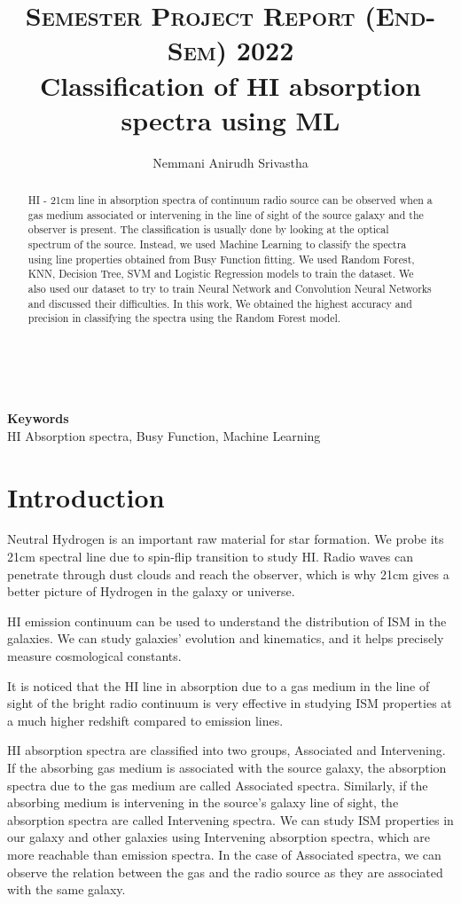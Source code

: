 \documentclass[10pt,twocolumn,letterpaper]{article}
\title{
		\usefont{OT1}{bch}{b}{n}
		\normalfont \normalsize \textsc{Semester Project Report (End-Sem) 2022} \\ [10pt]
		\huge Classification of HI absorption spectra using ML \\
}
\author{Nemmani Anirudh Srivastha}
\affil{\small{20191108 \\ Indian Institute of Science Education and Research Tirupati}}
\affil{Under the supervision of Dr Arunima Banerjee}
\begin{document}
\maketitle

\begin{abstract}
HI - 21cm line in absorption spectra of continuum radio source can be observed when a gas medium associated or intervening in the line of sight of the source galaxy and the observer is present. The classification is usually done by looking at the optical spectrum of the source. Instead, we used Machine Learning to classify the spectra using line properties obtained from Busy Function fitting. We used Random Forest, KNN, Decision Tree, SVM and Logistic Regression models to train the dataset. We also used our dataset to try to train Neural Network and Convolution Neural Networks and discussed their difficulties. In this work, We obtained the highest accuracy and precision in classifying the spectra using the Random Forest model.
\end{abstract} \\ 
\\ 
{\textbf{Keywords} \\
HI Absorption spectra, Busy Function, Machine Learning}

\section{Introduction}
Neutral Hydrogen is an important raw material for star formation. We probe its 21cm spectral line due to spin-flip transition to study HI. Radio waves can penetrate through dust clouds and reach the observer, which is why 21cm gives a better picture of Hydrogen in the galaxy or universe.

HI emission continuum can be used to understand the distribution of ISM in the galaxies\cite{1}. We can study galaxies' evolution and kinematics, and it helps precisely measure cosmological constants\cite{2}.

It is noticed that the HI line in absorption due to a gas medium in the line of sight of the bright radio continuum is very effective in studying ISM properties at a much higher redshift compared to emission lines\cite{3}.

HI absorption spectra are classified into two groups, Associated and Intervening. If the absorbing gas medium is associated with the source galaxy, the absorption spectra due to the gas medium are called Associated spectra. Similarly, if the absorbing medium is intervening in the source's galaxy line of sight, the absorption spectra are called Intervening spectra. We can study ISM properties in our galaxy and other galaxies using Intervening absorption spectra, which are more reachable than emission spectra\cite{4}. In the case of Associated spectra, we can observe the relation between the gas and the radio source as they are associated with the same galaxy\cite{3}.
\end{document}
